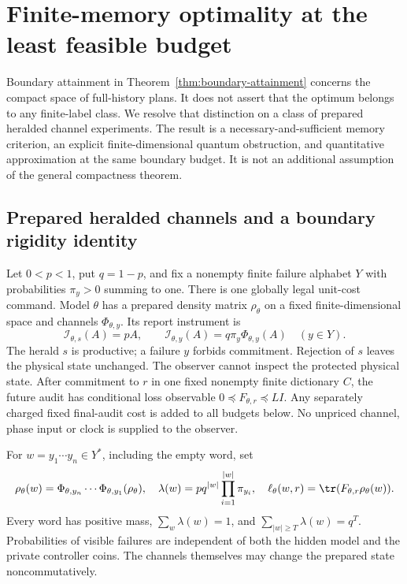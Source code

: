 \section{Finite-memory optimality at the least feasible budget}\label{sec:boundary-memory}
Boundary attainment in Theorem~\ref{thm:boundary-attainment} concerns the compact space of full-history plans. It does not assert that the optimum belongs to any finite-label class. We resolve that distinction on a class of prepared heralded channel experiments. The result is a necessary-and-sufficient memory criterion, an explicit finite-dimensional quantum obstruction, and quantitative approximation at the same boundary budget. It is not an additional assumption of the general compactness theorem.

\subsection{Prepared heralded channels and a boundary rigidity identity}
Let $0<p<1$, put $q=1-p$, and fix a nonempty finite failure alphabet $Y$ with probabilities $\pi_y>0$ summing to one. There is one globally legal unit-cost command. Model $\theta$ has a prepared density matrix $\rho_\theta$ on a fixed finite-dimensional space and channels $\Phi_{\theta,y}$. Its report instrument is
\begin{equation}\label{eq:herald-instrument}
 \mathcal I_{\theta,s}(A)=pA,\qquad
 \mathcal I_{\theta,y}(A)=q\pi_y\Phi_{\theta,y}(A)\quad(y\in Y).
\end{equation}
The herald $s$ is productive; a failure $y$ forbids commitment. Rejection of $s$ leaves the physical state unchanged. The observer cannot inspect the protected physical state. After commitment to $r$ in one fixed nonempty finite dictionary $C$, the future audit has conditional loss observable $0\preccurlyeq F_{\theta,r}\preccurlyeq LI$. Any separately charged fixed final-audit cost is added to all budgets below. No unpriced channel, phase input or clock is supplied to the observer.

For $w=y_1\cdots y_n\in Y^*$, including the empty word, set
\[
 \rho_\theta(w)=\Phi_{\theta,y_n}\cdots\Phi_{\theta,y_1}(\rho_\theta),\quad
 \lambda(w)=pq^{|w|}\prod_{i=1}^{|w|}\pi_{y_i},\quad
 \ell_\theta(w,r)=\tr(F_{\theta,r}\rho_\theta(w)).
\]
Every word has positive mass, $\sum_w\lambda(w)=1$, and $\sum_{|w|\ge T}\lambda(w)=q^T$. Probabilities of visible failures are independent of both the hidden model and the private controller coins. The channels themselves may change the prepared state noncommutatively.


